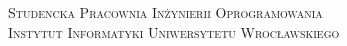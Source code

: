 \documentclass[12pt,a4paper]{report}
\begin{document}
\begin{titlepage}
\begin{center}
\textsc{Studencka Pracownia Inżynierii Oprogramowania}\\
\textsc{Instytut Informatyki Uniwersytetu Wrocławskiego}\\
\end{center}
\end{titlepage}
\end{document}
